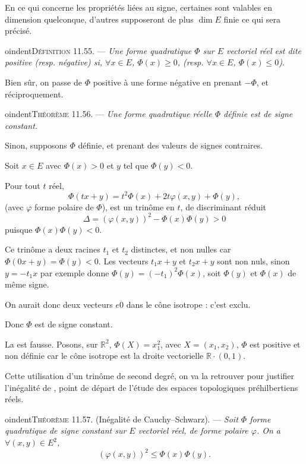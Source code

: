 
En ce qui concerne les propriétés liées au signe, certaines sont valables en dimension quelconque, d'autres supposeront de plus $\dim E$ finie ce qui sera précisé.

\medskip
oindent\textsc{Définition 11.55.} --- \emph{Une forme quadratique $\Phi$ sur $E$ vectoriel réel est dite positive (resp. négative) si, $\forall x\in E$, $\Phi(x)\ge0$, (resp. $\forall x\in E$, $\Phi(x)\le0$).}

Bien sûr, on passe de $\Phi$ positive à une forme négative en prenant $-\Phi$, et réciproquement.

\medskip
oindent\textsc{Théorème 11.56.} --- \emph{Une forme quadratique réelle $\Phi$ définie est de signe constant.}

Sinon, supposons $\Phi$ définie, et prenant des valeurs de signes contraires.

Soit $x\in E$ avec $\Phi(x)>0$ et $y$ tel que $\Phi(y)<0$.

Pour tout $t$ réel,
\[
\Phi(tx+y)=t^2\Phi(x)+2t\varphi(x,y)+\Phi(y),
\]
(avec $\varphi$ forme polaire de $\Phi$), est un trinôme en $t$, de discriminant réduit
\[
\Delta=(\varphi(x,y))^2-\Phi(x)\Phi(y)>0
\]
puisque $\Phi(x)\Phi(y)<0$.

Ce trinôme a deux racines $t_1$ et $t_2$ distinctes, et non nulles car $\Phi(0x+y)=\Phi(y)<0$. Les vecteurs $t_1x+y$ et $t_2x+y$ sont non nuls, sinon $y=-t_1x$ par exemple donne $\Phi(y)=(-t_1)^2\Phi(x)$, soit $\Phi(y)$ et $\Phi(x)$ de même signe.

On aurait donc deux vecteurs $
e0$ dans le cône isotrope : c'est exclu.

Donc $\Phi$ est de signe constant. \bookend

La  est fausse. Posons, sur $\mathbb R^2$, $\Phi(X)=x_1^2$, avec $X=(x_1,x_2)$, $\Phi$ est positive et non définie car le cône isotrope est la droite vectorielle $\mathbb R\cdot(0,1)$.

Cette utilisation d'un trinôme de second degré, on va la retrouver pour justifier l'inégalité de , point de départ de l'étude des espaces topologiques préhilbertiens réels.

\medskip
oindent\textsc{Théorème 11.57.} (Inégalité de Cauchy--Schwarz). --- \emph{Soit $\Phi$ forme quadratique de signe constant sur $E$ vectoriel réel, de forme polaire $\varphi$. On a $\forall(x,y)\in E^2$,}
\[
(\varphi(x,y))^2\le\Phi(x)\Phi(y).
\]

